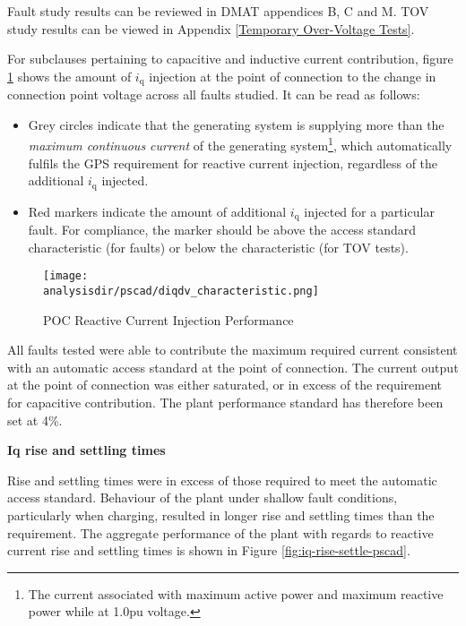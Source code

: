 \documentclass{../grid-link-report}
\newcommand{\analysisdir}{report-assets/analysis}
\begin{document}
			Fault study results can be reviewed in DMAT appendices B, C and M. TOV study results can be viewed in Appendix \ref{Temporary Over-Voltage Tests}.
		
			For subclauses pertaining to capacitive and inductive current contribution, figure \ref{fig:5255-pscad-diqdv-poc} shows the amount of $i_{\text{q}}$ injection at the point of connection to the change in connection point voltage across all faults studied. It can be read as follows:
			\begin{itemize}
				\item Grey circles indicate that the generating system is supplying more than the \textit{maximum continuous current} of the generating system\footnote{The current associated with maximum active power and maximum reactive power while at 1.0pu voltage.}, which automatically fulfils the GPS requirement for reactive current injection, regardless of the additional $i_{\text{q}}$ injected.
				\item Red markers indicate the amount of additional $i_{\text{q}}$ injected for a particular fault. For compliance, the marker should be above the access standard characteristic (for faults) or below the characteristic (for \ac{TOV} tests).
			\end{itemize}
			
			\begin{figure}[H]
				\centering
				\texttt{[image: \\analysisdir/pscad/diqdv\_characteristic.png]}
				\caption{POC Reactive Current Injection Performance}
				\label{fig:5255-pscad-diqdv-poc}
			\end{figure}
			

			 All faults tested were able to contribute the maximum required current consistent with an automatic access standard at the point of connection. The current output at the point of connection was either saturated, or in excess of the requirement for capacitive contribution. The plant performance standard has therefore been set at 4\%.
			 
			\textbf{Iq rise and settling times}
			
			Rise and settling times were in excess of those required to meet the automatic access standard. Behaviour of the plant under shallow fault conditions, particularly when charging, resulted in longer rise and settling times than the requirement. The aggregate performance of the plant with regards to reactive current rise and settling times is shown in Figure \ref{fig:iq-rise-settle-pscad}.
			
\end{document}
